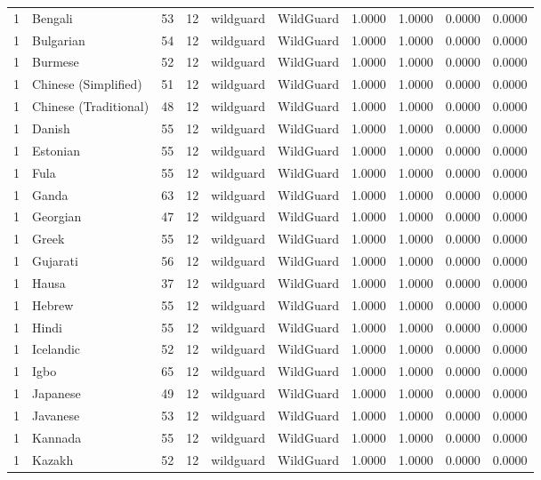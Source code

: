 \begin{tabular}{rlrrllrrrr}
1 & Bengali & 53 & 12 & wildguard & WildGuard & 1.0000 & 1.0000 & 0.0000 & 0.0000 \\
1 & Bulgarian & 54 & 12 & wildguard & WildGuard & 1.0000 & 1.0000 & 0.0000 & 0.0000 \\
1 & Burmese & 52 & 12 & wildguard & WildGuard & 1.0000 & 1.0000 & 0.0000 & 0.0000 \\
1 & Chinese (Simplified) & 51 & 12 & wildguard & WildGuard & 1.0000 & 1.0000 & 0.0000 & 0.0000 \\
1 & Chinese (Traditional) & 48 & 12 & wildguard & WildGuard & 1.0000 & 1.0000 & 0.0000 & 0.0000 \\
1 & Danish & 55 & 12 & wildguard & WildGuard & 1.0000 & 1.0000 & 0.0000 & 0.0000 \\
1 & Estonian & 55 & 12 & wildguard & WildGuard & 1.0000 & 1.0000 & 0.0000 & 0.0000 \\
1 & Fula & 55 & 12 & wildguard & WildGuard & 1.0000 & 1.0000 & 0.0000 & 0.0000 \\
1 & Ganda & 63 & 12 & wildguard & WildGuard & 1.0000 & 1.0000 & 0.0000 & 0.0000 \\
1 & Georgian & 47 & 12 & wildguard & WildGuard & 1.0000 & 1.0000 & 0.0000 & 0.0000 \\
1 & Greek & 55 & 12 & wildguard & WildGuard & 1.0000 & 1.0000 & 0.0000 & 0.0000 \\
1 & Gujarati & 56 & 12 & wildguard & WildGuard & 1.0000 & 1.0000 & 0.0000 & 0.0000 \\
1 & Hausa & 37 & 12 & wildguard & WildGuard & 1.0000 & 1.0000 & 0.0000 & 0.0000 \\
1 & Hebrew & 55 & 12 & wildguard & WildGuard & 1.0000 & 1.0000 & 0.0000 & 0.0000 \\
1 & Hindi & 55 & 12 & wildguard & WildGuard & 1.0000 & 1.0000 & 0.0000 & 0.0000 \\
1 & Icelandic & 52 & 12 & wildguard & WildGuard & 1.0000 & 1.0000 & 0.0000 & 0.0000 \\
1 & Igbo & 65 & 12 & wildguard & WildGuard & 1.0000 & 1.0000 & 0.0000 & 0.0000 \\
1 & Japanese & 49 & 12 & wildguard & WildGuard & 1.0000 & 1.0000 & 0.0000 & 0.0000 \\
1 & Javanese & 53 & 12 & wildguard & WildGuard & 1.0000 & 1.0000 & 0.0000 & 0.0000 \\
1 & Kannada & 55 & 12 & wildguard & WildGuard & 1.0000 & 1.0000 & 0.0000 & 0.0000 \\
1 & Kazakh & 52 & 12 & wildguard & WildGuard & 1.0000 & 1.0000 & 0.0000 & 0.0000 \\

\end{tabular}
